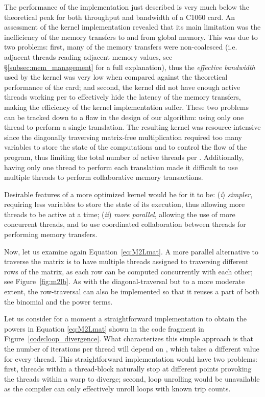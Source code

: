 The performance of the implementation just described is very much below the theoretical peak for both throughput and bandwidth of a C1060 {\tesla} card. An assessment of the {\cuda} kernel implementation revealed that its main limitation was the inefficiency of the memory transfers to and from global memory. This was due to two problems: first, many of the memory transfers were non-coalesced (i.e. adjacent threads reading adjacent memory values, see \S\ref{subsec:mem_management} for a full explanation), thus the \emph{effective bandwidth} used by the kernel was very low when compared against the theoretical performance of the card; and second, the kernel did not have enough active threads working per {\sm} to effectively hide the latency of the memory transfers, making the efficiency of the kernel implementation suffer. These two problems can be tracked down to a flaw in the design of our algorithm: using only one {\cuda} thread to perform a single translation.
The resulting kernel was resource-intensive since the diagonally traversing matrix-free multiplication required too many variables to store the state of the computations and to control the flow of the program, thus limiting the total number of active threads per {\sm}.
Additionally, having only one thread to perform each translation made it difficult to use multiple threads to perform collaborative memory transactions. 

Desirable features of a more optimized kernel would be for it to be: (\emph{i}) \emph{simpler}, requiring less variables to store the state of its execution, thus allowing more threads to be active at a time; (\emph{ii}) \emph{more parallel}, allowing the use of more concurrent threads, and to use coordinated collaboration between threads for performing memory transfers. 

Now, let us examine again Equation~\eqref{eq:M2Lmat}. A more parallel alternative to traverse the matrix is to have multiple {\cuda} threads assigned to traversing different rows of the matrix, as each row can be computed concurrently with each other; see Figure~\ref{fig:m2lb}.
As with the diagonal-traversal but to a more moderate extent, the row-traversal can also be implemented so that it reuses a part of both the binomial and the power terms.

Let us consider for a moment a straightforward implementation to obtain the powers in Equation \eqref{eq:M2Lmat} shown in the code fragment in Figure~\ref{code:loop_divergence}. What characterizes this simple approach is that the number of iterations per thread will depend on , which takes a different value for every thread. This straightforward implementation would have two problems: first, threads within a thread-block naturally stop at different points provoking the threads within a warp to diverge; second, loop unrolling would be unavailable as the compiler can only effectively unroll loops with known trip counts.

